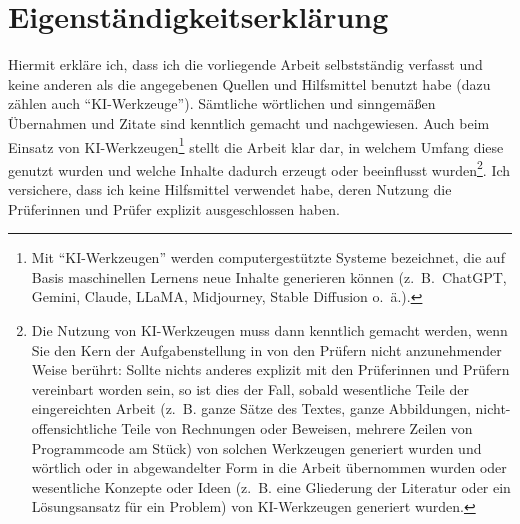 %

{
\chapter*{Eigenständigkeitserklärung}
\label{sec:declaration}
\thispagestyle{empty}
{Hiermit erkläre ich, dass ich die vorliegende Arbeit selbstständig verfasst und keine anderen als die angegebenen Quellen und Hilfsmittel benutzt habe (dazu zählen auch "`KI-Werkzeuge"'). Sämtliche wörtlichen und sinngemäßen Übernahmen und Zitate sind kenntlich gemacht und nachgewiesen. Auch beim Einsatz von KI-Werkzeugen\footnote{Mit "`KI-Werkzeugen"' werden computergestützte Systeme bezeichnet, die auf Basis maschinellen Lernens neue Inhalte generieren können (z.~B.\ ChatGPT, Gemini, Claude, LLaMA, Midjourney, Stable Diffusion o.~ä.). } stellt die Arbeit klar dar, in welchem Umfang diese genutzt wurden und welche Inhalte dadurch erzeugt oder beeinflusst wurden\footnote{Die Nutzung von KI-Werkzeugen muss dann kenntlich gemacht werden, wenn Sie den Kern der Aufgabenstellung in von den Prüfern nicht anzunehmender Weise berührt: Sollte nichts anderes explizit mit den Prüferinnen und Prüfern vereinbart worden sein, so ist dies der Fall, sobald wesentliche Teile der eingereichten Arbeit (z.~B. ganze Sätze des Textes, ganze Abbildungen, nicht-offensichtliche Teile von Rechnungen oder Beweisen, mehrere Zeilen von Programmcode am Stück) von solchen Werkzeugen generiert wurden und wörtlich oder in abgewandelter Form in die Arbeit übernommen wurden oder wesentliche Konzepte oder Ideen (z.~B. eine Gliederung der Literatur oder ein Lösungsansatz für ein Problem) von KI-Werkzeugen generiert wurden.}. Ich versichere, dass ich keine Hilfsmittel verwendet habe, deren Nutzung die Prüferinnen und Prüfer explizit ausgeschlossen haben. 
    
}}
